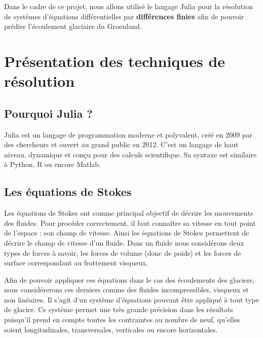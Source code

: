 \documentclass{article}
\begin{document}
Dans le cadre de ce projet, nous allons utilisé le langage Julia pour la résolution de systèmes d'équations différentielles par \textbf{différences finies} afin de pouvoir prédire l'écoulement glaciaire du Groenland.


\section{Présentation des techniques de résolution}

\subsection{Pourquoi Julia ?}

Julia est un langage de programmation moderne et polyvalent, créé en 2009 par des chercheurs et ouvert au grand public en 2012. C'est un langage de haut niveau, dynamique et conçu pour des calculs scientifique. Sa syntaxe est similaire à Python, R ou encore Matlab.
 


\subsection{Les équations de Stokes}

Les équations de Stokes \cite{site1} ont comme principal objectif de décrire les mouvements des fluides. 
Pour procéder correctement, il faut connaître sa vitesse en tout point de l'espace : son champ de vitesse. Ainsi les équations de Stokes permettent de décrire le champ de vitesse d'un fluide. 
Dans un fluide nous considérons deux types de forces à savoir, les forces de volume (donc de poids) et les forces de surface correspondant au frottement visqueux. 

Afin de pouvoir appliquer ces équations dans le cas des écoulements des glaciers, nous considérerons ces derniers comme des fluides incompressibles, visqueux et non linéaires. Il s'agit d'un système d'équations pouvant être appliqué à tout type de glacier.
\newpage
Ce système permet une très grande précision dans les résultats puisqu'il prend en compte toutes les contraintes au nombre de neuf, qu’elles soient longitudinales, transversales, verticales ou encore horizontales. 
\end{document}
